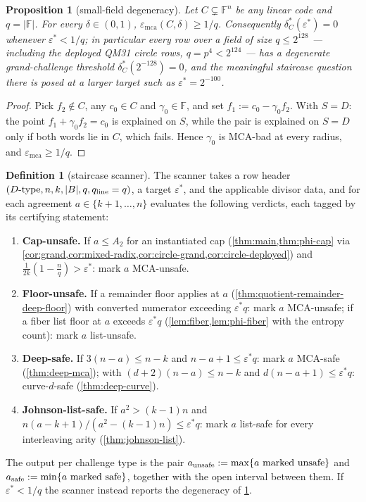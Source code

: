 \documentclass[11pt]{article}
\newtheorem{proposition}[theorem]{Proposition}
\theoremstyle{definition}
\newtheorem{definition}[theorem]{Definition}
\theoremstyle{remark}
\newcommand{\F}{\mathbb{F}}
\newcommand{\B}{B}
\newcommand{\emca}{\varepsilon_{\mathrm{mca}}}
\begin{document}
\begin{proposition}[small-field degeneracy]\label{prop:small-field}
Let $C\subsetneq\F^n$ be any linear code and $q=|\F|$. For every $\delta\in(0,1)$, $\emca(C,\delta)\ge1/q$. Consequently $\delta^*_C(\varepsilon^*)=0$ whenever $\varepsilon^*<1/q$; in particular every row over a field of size $q\le2^{128}$ --- including the deployed QM31 circle rows, $q=p^4<2^{124}$ --- has a degenerate grand-challenge threshold $\delta^*_C(2^{-128})=0$, and the meaningful staircase question there is posed at a larger target such as $\varepsilon^*=2^{-100}$.
\end{proposition}

\begin{proof}
Pick $f_2\notin C$, any $c_0\in C$ and $\gamma_0\in\F$, and set $f_1:=c_0-\gamma_0f_2$. With $S=D$: the point $f_1+\gamma_0f_2=c_0$ is explained on $S$, while the pair is explained on $S=D$ only if both words lie in $C$, which fails. Hence $\gamma_0$ is MCA-bad at every radius, and $\emca\ge1/q$.
\end{proof}

\begin{definition}[staircase scanner]\label{def:scanner}
The scanner takes a row header $(D\text{-type},n,k,|\B|,q,q_{\rm line}=q)$, a target $\varepsilon^*$, and the applicable divisor data, and for each agreement $a\in\{k+1,\dots,n\}$ evaluates the following verdicts, each tagged by its certifying statement:
\begin{enumerate}[label=\textup{(V\arabic*)},leftmargin=2.6em]
\item \textbf{Cap-unsafe.} If $a\le A_2$ for an instantiated cap \textup(\cref{thm:main,thm:phi-cap} via \cref{cor:grand,cor:mixed-radix,cor:circle-grand,cor:circle-deployed}\textup) and $\frac1{2k}(1-\frac nq)>\varepsilon^*$: mark $a$ MCA-unsafe.
\item \textbf{Floor-unsafe.} If a remainder floor applies at $a$ \textup(\cref{thm:quotient-remainder-deep-floor}\textup) with converted numerator exceeding $\varepsilon^*q$: mark $a$ MCA-unsafe; if a fiber list floor at $a$ exceeds $\varepsilon^*q$ \textup(\cref{lem:fiber,lem:phi-fiber} with the entropy count\textup): mark $a$ list-unsafe.
\item \textbf{Deep-safe.} If $3(n-a)\le n-k$ and $n-a+1\le\varepsilon^*q$: mark $a$ MCA-safe \textup(\cref{thm:deep-mca}\textup); with $(d+2)(n-a)\le n-k$ and $d(n-a+1)\le\varepsilon^*q$: curve-$d$-safe \textup(\cref{thm:deep-curve}\textup).
\item \textbf{Johnson-list-safe.} If $a^2>(k-1)n$ and $n(a-k+1)/(a^2-(k-1)n)\le\varepsilon^*q$: mark $a$ list-safe for every interleaving arity \textup(\cref{thm:johnson-list}\textup).
\end{enumerate}
The output per challenge type is the pair $a_{\rm unsafe}:=\max\{a\ \text{marked unsafe}\}$ and $a_{\rm safe}:=\min\{a\ \text{marked safe}\}$, together with the open interval between them. If $\varepsilon^*<1/q$ the scanner instead reports the degeneracy of \cref{prop:small-field}.
\end{definition}
\end{document}
